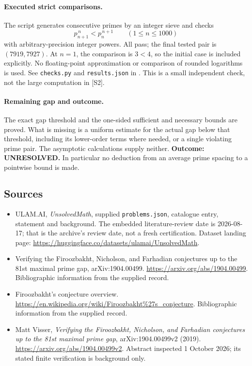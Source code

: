 \documentclass[11pt,a4paper]{article}
\begin{document}
\paragraph{Executed strict comparisons.}
The script generates consecutive primes by an integer sieve and checks
\[
 p_{n+1}^{\,n}<p_n^{\,n+1}\qquad(1\le n\le1000)
\]
with arbitrary-precision integer powers. All pass; the final tested
pair is $(7919,7927)$. At $n=1$, the comparison is $3<4$, so the
initial case is included explicitly. No floating-point approximation
or comparison of rounded logarithms is used. See
\texttt{checks.py} and \texttt{results.json} in
.
This is a small independent check, not the large computation in [S2].

\paragraph{Remaining gap and outcome.}
The exact gap threshold and the one-sided sufficient and necessary
bounds are proved. What is missing is a uniform estimate for the actual
gap below that threshold, including its lower-order terms where needed,
or a single violating prime pair. The asymptotic calculations supply
neither. \textbf{Outcome: UNRESOLVED.} In particular no deduction from
an average prime spacing to a pointwise bound is made.

\subsection{Sources}

{\small

\begin{itemize}

\item[\hypertarget{source:statement:1}{S1}] ULAM.AI, \emph{UnsolvedMath}, supplied \texttt{problems.json}, catalogue entry, statement and background. The embedded literature-review date is 2026-08-17; that is the archive’s review date, not a fresh certification. Dataset landing page: \url{https://huggingface.co/datasets/ulamai/UnsolvedMath}.

\item[\hypertarget{source:statement:2}{S2}] Verifying the Firoozbakht, Nicholson, and Farhadian conjectures up to the 81st maximal prime gap, arXiv:1904.00499. \url{https://arxiv.org/abs/1904.00499}. Bibliographic information from the supplied record.

\item[\hypertarget{source:statement:3}{S3}] Firoozbakht's conjecture overview. \url{https://en.wikipedia.org/wiki/Firoozbakht%27s_conjecture}. Bibliographic information from the supplied record.


\item[E1] Matt Visser, \emph{Verifying the Firoozbakht,
Nicholson, and Farhadian conjectures up to the 81st maximal prime gap},
arXiv:1904.00499v2 (2019).
\url{https://arxiv.org/abs/1904.00499v2}. Abstract inspected
1 October 2026; its stated finite verification is background only.

\end{itemize}

}

\label{end:statement}
\end{document}
